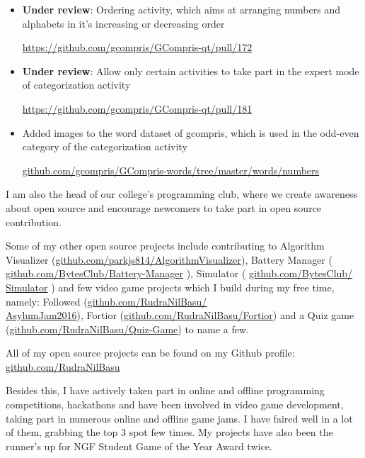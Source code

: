\documentclass[preprint,12pt]{elsarticle}
\begin{document}
\begin{itemize}
\item \textbf{Under review}: Ordering activity, which aims at arranging numbers and alphabets in it's increasing or decreasing order

\href{https://github.com/gcompris/GCompris-qt/pull/172}{https://github.com/gcompris/GCompris-qt/pull/172}

\item \textbf{Under review}: Allow only certain activities to take part in the expert mode of categorization activity

\href{https://github.com/gcompris/GCompris-qt/pull/181}{https://github.com/gcompris/GCompris-qt/pull/181}

\item Added images to the word dataset of gcompris, which is used in the odd-even category of the categorization activity

\href{https://github.com/gcompris/GCompris-words/tree/master/words/numbers}{github.com/gcompris/GCompris-words/tree/master/words/numbers}

\end{itemize}

I am also the head of our college's programming club, where we create awareness about open source and encourage newcomers to take part in open source contribution.

Some of my other open source projects include contributing to Algorithm Visualizer (\href{https://github.com/parkjs814/AlgorithmVisualizer}{github.com/parkjs814/AlgorithmVisualizer}), Battery Manager ( \href{https://github.com/BytesClub/Battery_Manager}{github.com/BytesClub/Battery-Manager} ), Simulator ( \href{https://github.com/BytesClub/Simulator}{github.com/BytesClub/\\Simulator} ) and few video game projects which I build during my free time, namely: Followed (\href{https://github.com/RudraNilBasu/AsylumJam2016}{github.com/RudraNilBasu/\\AsylumJam2016}), Fortior (\href{https://github.com/RudraNilBasu/Fortior}{github.com/RudraNilBasu/Fortior}) and a Quiz game (\href{https://github.com/RudraNilBasu/Quiz-Game}{github.com/RudraNilBasu/Quiz-Game}) to name a few.

All of my open source projects can be found on my Github profile: \href{https://github.com/RudraNilBasu}{github.com/RudraNilBasu}


Besides this, I have actively taken part in online and offline programming competitions, hackathons and have been involved in video game development, taking part in numerous online and offline game jams. I have faired well in a lot of them, grabbing the top 3 spot few times. My projects have also been the runner’s up for NGF Student Game of the Year Award twice.
\end{document}
